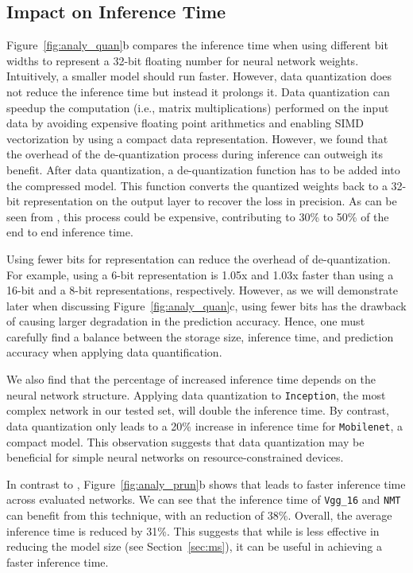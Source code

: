 \subsection{Impact on Inference Time}
 Figure~\ref{fig:analy_quan}b compares the inference time when using different bit
widths to represent a 32-bit floating number for neural network weights. Intuitively, a smaller model should run faster. However, data
quantization does not reduce the inference time but instead it prolongs it. Data quantization can speedup the computation (i.e., matrix
multiplications) performed on the input data by avoiding expensive floating point arithmetics and enabling SIMD vectorization by using a
compact data representation. However, we found that the overhead of the de-quantization process during inference can outweigh its benefit.
After data quantization, a de-quantization function has to be added into the compressed model. This  function converts the quantized
weights back to a 32-bit representation on the output layer to recover the loss in precision. As can be seen from ,
this process could be expensive, contributing to 30\% to 50\% of the end to end inference time.

Using fewer bits for representation can reduce the overhead of de-quantization. For example, using a 6-bit representation is 1.05x and
1.03x faster than using a 16-bit and a 8-bit representations, respectively. However, as we will demonstrate later when discussing
Figure~\ref{fig:analy_quan}c, using fewer bits has the drawback of causing larger degradation in the prediction accuracy. Hence, one must
carefully find a balance between the storage size, inference time, and prediction accuracy when applying data quantification.

We also find that the percentage of increased inference time depends on the neural network structure. Applying data quantization to
\texttt{Inception}, the most complex network in our \CNN tested set, will double the inference time. By contrast, data quantization only
leads to a 20\% increase in inference time for \texttt{Mobilenet}, a compact model. This observation suggests that data quantization may be
beneficial for simple neural networks on resource-constrained devices.


In contrast to \quantization, Figure~\ref{fig:analy_prun}b shows that \pruning leads to faster inference time across evaluated networks. We
can see that the inference time of \texttt{Vgg\_16} and \texttt{NMT} can benefit from this technique, with an reduction of 38\%.  Overall,
the average inference time is reduced by 31\%. This suggests that while \pruning is less effective in reducing the model size (see
Section~\ref{sec:ms}), it can be useful in achieving a faster inference time.



